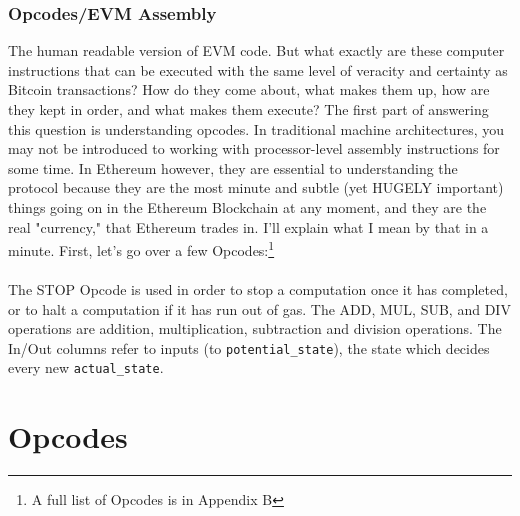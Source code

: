 \documentclass[10pt,a4paper,leqno,bibliography=totoc]{scrartcl}
\newenvironment{alphafootnotes}
{\par\edef\savedfootnotenumber{\number\value{footnote}}
\renewcommand{\thefootnote}{\alph{footnote}}
\setcounter{footnote}{0}}
{\par\setcounter{footnote}{\savedfootnotenumber}}
\begin{document}
\begin{alphafootnotes}
\begin{multicols*}{2}
			\subsubsection{Opcodes/EVM Assembly}
		The human readable version of EVM code. But what exactly are these computer instructions that can be executed with the same level of veracity and certainty as Bitcoin transactions? How do they come about, what makes them up, how are they kept in order, and what makes them execute? The first part of answering this question is understanding opcodes. In traditional machine architectures, you may not be introduced to working with processor-level assembly instructions for some time. In Ethereum however, they are essential to understanding the protocol because they are the most minute and subtle (yet HUGELY important) things going on in the Ethereum Blockchain at any moment, and they are the real "currency," that Ethereum trades in. I'll explain what I mean by that in a minute. First, let's go over a few Opcodes:\footnote{A full list of Opcodes is in Appendix B} \\


				\paragraph{}The STOP Opcode is used in order to stop a computation once it has completed, or to halt a computation if it has run out of gas. The ADD, MUL, SUB, and DIV operations are addition, multiplication, subtraction and division operations. The In/Out columns refer to inputs (to \texttt{potential\_state}), the state which decides every new \texttt{actual\_state}. 

	\end{multicols*}

	\appendix

	\section{Opcodes}


\end{alphafootnotes}
\end{document}
